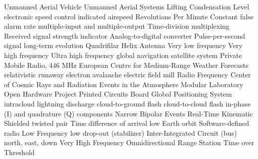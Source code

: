 {Unmanned Aerial Vehicle}
 {Unmanned Aerial Systems}
 {Lifting Condensation Level}
 {electronic speed control}
 {indicated airspeed}
 {Revolutions Per Minute}
 {Constant false alarm rate}
 {multiple-input and multiple-output}
 {Time-division multiplexing}
 {Received signal strength indicator}
 {Analog-to-digital converter}
 {Pulse-per-second signal}
 {long-term evolution}
 {Quadrifilar Helix Antenna}
 {Very low frequency}
 {Very high frequency}
 {Ultra high frequency}
 {global navigation satellite system}
 {Private Mobile Radio, 446 MHz}
 {European Centre for Medium-Range Weather Forecasts}
 {relativistic runaway electron avalanche}
 {electric field mill}
 {Radio Frequency}
 {Center of Cosmic Rays and Radiation Events in the Atmosphere}
 {Modular Laboratory Open Hardware Project}
 {Printed Circuits Board}
 {Global Positioning System}
 {intracloud lightning discharge}
 {cloud-to-ground flash}
 {cloud-to-cloud flash}
 {in-phase (I) and quadrature (Q) components}
 {Narrow Bipolar Events}
 {Real-Time Kinematic}
 {Shielded twisted pair}
 {Time difference of arrival}
  {low Earth orbit}
 {Software-defined radio}
 {Low Frequency}
 {low drop-out (stabilizer)}
 {Inter-Integrated Circuit (bus)}
 {north, east, down}
 {Very High Frequency Omnidirectional Range Station}
 {Time over Threshold}


